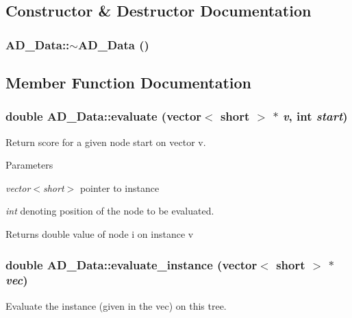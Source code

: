\subsection{Constructor \& Destructor Documentation}
\hypertarget{classAD__Data_a57f2d885255d7c1cc4a58ef0b25dc70f}{
\subsubsection[{$\sim$AD\_\-Data}]{\setlength{\rightskip}{0pt plus 5cm}AD\_\-Data::$\sim$AD\_\-Data ()}}
\label{classAD__Data_a57f2d885255d7c1cc4a58ef0b25dc70f}


\subsection{Member Function Documentation}
\hypertarget{classAD__Data_ad4c7e18955e518adb3816ad59929a3f5}{
\subsubsection[{evaluate}]{\setlength{\rightskip}{0pt plus 5cm}double AD\_\-Data::evaluate (vector$<$ short $>$ $\ast$ {\em v}, \/  int {\em start})}}
\label{classAD__Data_ad4c7e18955e518adb3816ad59929a3f5}
Return score for a given node start on vector v.


\begin{DoxyParams}{Parameters}
\item[{\em vector$<$short$>$}]pointer to instance \item[{\em int}]denoting position of the node to be evaluated. \end{DoxyParams}
\begin{DoxyReturn}{Returns}
double value of node i on instance v 
\end{DoxyReturn}
\hypertarget{classAD__Data_a27ee25978ea9544be17a0d63a2381cce}{
\subsubsection[{evaluate\_\-instance}]{\setlength{\rightskip}{0pt plus 5cm}double AD\_\-Data::evaluate\_\-instance (vector$<$ short $>$ $\ast$ {\em vec})}}
\label{classAD__Data_a27ee25978ea9544be17a0d63a2381cce}
Evaluate the instance (given in the vec) on this tree.


